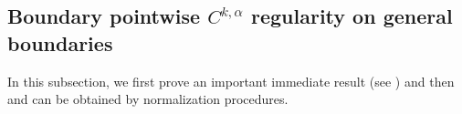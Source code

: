 \documentclass[preprint,12pt]{elsarticle}
\newtheorem{corollary}[theorem]{Corollary}
\theoremstyle{definition}
\theoremstyle{remark}
\newtheorem{remark}[theorem]{Remark}
\numberwithin{equation}{section}
\begin{document}

\subsection{Boundary pointwise $C^{k, \alpha}$ regularity on general boundaries}
\label{subsec:Cka.free}

In this subsection, we first prove an important immediate result (see ) and then  and  can be obtained by normalization procedures.

%
\end{document}
